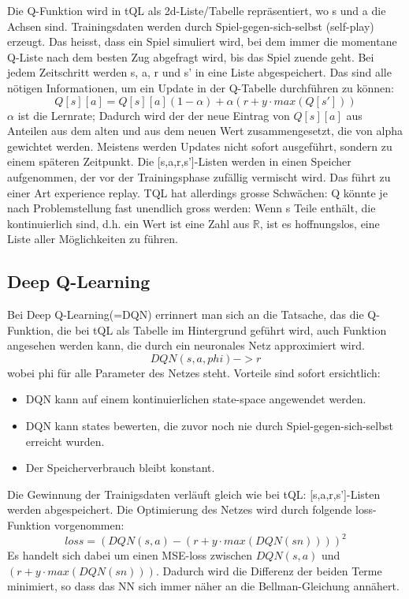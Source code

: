 \documentclass[12pt,a4paper]{article}
\begin{document}
Die Q-Funktion wird in tQL als 2d-Liste/Tabelle repräsentiert, wo s und a die Achsen sind.
Trainingsdaten werden durch Spiel-gegen-sich-selbst (self-play) erzeugt. Das heisst, dass ein Spiel simuliert wird, bei dem immer die momentane Q-Liste nach dem besten Zug abgefragt wird, bis das Spiel zuende geht. Bei jedem Zeitschritt werden s, a, r und s' in eine Liste abgespeichert. Das sind alle nötigen Informationen, um ein Update in der Q-Tabelle durchführen zu können:
$$Q[s][a] = Q[s][a] (1-\alpha) +\alpha( r + y \cdot max( Q[s'] ) ) $$
$\alpha$ ist die Lernrate; Dadurch wird der der neue Eintrag von $Q[s][a]$ aus Anteilen aus dem alten und aus dem neuen Wert zusammengesetzt, die von alpha gewichtet werden.
Meistens werden Updates nicht sofort ausgeführt, sondern zu einem späteren Zeitpunkt. Die [s,a,r,s']-Listen werden in einen Speicher aufgenommen, der vor der Trainingsphase zufällig vermischt wird. Das führt zu einer Art experience replay.\cite{lilblog}
TQL hat allerdings grosse Schwächen: Q könnte je nach Problemstellung fast unendlich gross werden:
Wenn s Teile enthält, die kontinuierlich sind, d.h. ein Wert ist eine Zahl aus $\mathbb{R}$, ist es hoffnungslos, eine Liste aller Möglichkeiten zu führen.

\subsection{Deep Q-Learning}
Bei Deep Q-Learning(=DQN) errinnert man sich an die Tatsache, das die Q-Funktion, die bei tQL als Tabelle im Hintergrund geführt wird, auch Funktion angesehen werden kann, die durch ein neuronales Netz approximiert wird.
	$$DQN(s,a,phi) -> r$$
wobei phi für alle Parameter des Netzes steht.
Vorteile sind sofort ersichtlich:
\begin{itemize}
\item{DQN kann auf einem kontinuierlichen state-space angewendet werden.}
\item{DQN kann states bewerten, die zuvor noch nie durch Spiel-gegen-sich-selbst erreicht wurden.}
\item{Der Speicherverbrauch bleibt konstant.}
\end{itemize}
Die Gewinnung der Trainigsdaten verläuft gleich wie bei tQL: [s,a,r,s']-Listen werden abgespeichert. Die Optimierung des Netzes wird durch folgende loss-Funktion vorgenommen:
	$$loss = (DQN(s,a) - (r + y \cdot max(DQN(sn))))^2$$
Es handelt sich dabei um einen MSE-loss zwischen $DQN(s,a)$ und $(r + y \cdot max(DQN(sn)))$. Dadurch wird die Differenz der beiden Terme minimiert, so dass das NN sich immer näher an die Bellman-Gleichung annähert.
\end{document}
